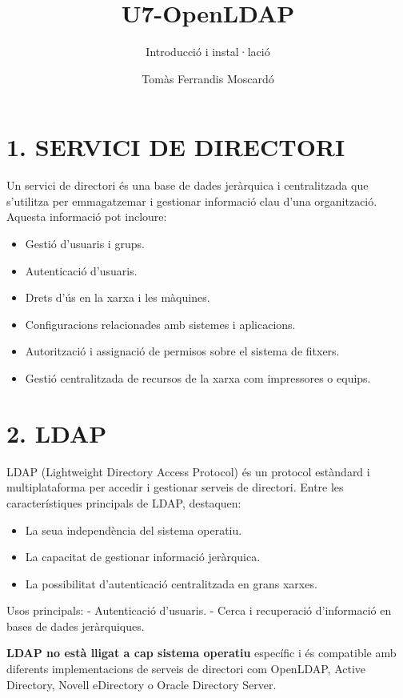 \documentclass[
  12 pt,
  a4paper,
]{article}
\title{U7-OpenLDAP}
\subtitle{Introducció i instal·lació}
\author{Tomàs Ferrandis Moscardó}
\date{}
\providecommand{\tightlist}{%
  \setlength{\itemsep}{0pt}\setlength{\parskip}{0pt}}
\begin{document}
\maketitle

\section{1. SERVICI DE DIRECTORI}\label{servici-de-directori}

Un servici de directori és una base de dades jeràrquica i centralitzada
que s'utilitza per emmagatzemar i gestionar informació clau d'una
organització. Aquesta informació pot incloure:

\begin{itemize}
\tightlist
\item
  Gestió d'usuaris i grups.
\item
  Autenticació d'usuaris.
\item
  Drets d'ús en la xarxa i les màquines.
\item
  Configuracions relacionades amb sistemes i aplicacions.
\item
  Autorització i assignació de permisos sobre el sistema de fitxers.
\item
  Gestió centralitzada de recursos de la xarxa com impressores o equips.
\end{itemize}

\section{2. LDAP}\label{ldap}

LDAP (Lightweight Directory Access Protocol) és un protocol estàndard i
multiplataforma per accedir i gestionar serveis de directori. Entre les
característiques principals de LDAP, destaquen:

\begin{itemize}
\tightlist
\item
  La seua independència del sistema operatiu.
\item
  La capacitat de gestionar informació jeràrquica.
\item
  La possibilitat d'autenticació centralitzada en grans xarxes.
\end{itemize}

Usos principals: - Autenticació d'usuaris. - Cerca i recuperació
d'informació en bases de dades jeràrquiques.

\textbf{LDAP no està lligat a cap sistema operatiu} específic i és
compatible amb diferents implementacions de serveis de directori com
OpenLDAP, Active Directory, Novell eDirectory o Oracle Directory Server.
\end{document}

